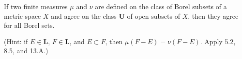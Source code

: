 If two finite measures $\mu$ and $\nu$ are defined on the class of Borel subsets of a metric space $X$ and agree on the class $\mathbf{U}$ of open subsets of $X$, then they agree for all Borel sets.

(Hint: if $E \in \mathbf{L}$, $F \in \mathbf{L}$, and $E \subset F$, then $\mu(F - E) = \nu(F - E)$. Apply 5.2, 8.5, and 13.A.)
